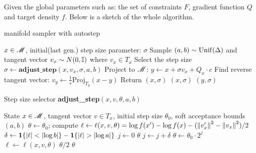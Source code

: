 \documentclass{article}
\begin{document}
Given the global parameters such as: the set of constraints $F$, gradient function $Q$ and target density $f$. Below is a sketch of the whole algorithm.
\begin{algorithm}[H]
\caption{manifold sampler with autostep}
\label{algo:manifold_autostep}
\begin{algorithmic}[1]  
    \Require $x \in \mathscr{M}$, initial(last gen.) step size parameter: $\sigma$
    \State Sample $(a, b) \sim \operatorname{Unif}(\Delta)$ and tangent vector $v_x \sim N(0, \mathbb I)$ where $v_x \in T_x$
    \State Select the step size $\sigma \gets \textbf{adjust\_step}(x, v_x, \sigma, a, b)$ 
    \State Project to $\mathscr{M}$: $y \gets x + \sigma v_x + Q_x\cdot c$ 
    \State Find reverse tangent vector: $v_y \gets \frac{1}{s} \text{Proj}_{T_y}(x-y)$
      
        \State Return $(x, \sigma)$
    \EndIf
     
        \State \Return $(x, \sigma)$
    \EndIf
    \State \Return $(y, \sigma)$
    \end{algorithmic}
\end{algorithm}


\begin{algorithm}[H]
\caption{Step size selector \textbf{adjust\_step}$(x, v, \theta, a, b)$}
\label{algo:stepsize_selector}
\begin{algorithmic}[1]
\Require State $x \in \mathscr{M}$, tangent vector $v \in T_x$, initial step size $\theta_0$, soft acceptance bounds $(a, b)$ 
\State $\theta \gets \theta_0$; compute $\ell \gets \ell(x, v, \theta) = \log f(x') - \log f(x) - (\left\lVert v_x'\right\rVert^2-\left\lVert v_x\right\rVert^2) / 2$
\State $\delta \gets {\mathbf 1}\{\left|\ell\right| < \left|\log b\right|\} - {\mathbf 1}\{\left|\ell\right| > \left|\log a\right|\}$
\State $j \gets 0$
    \State \Return $\theta$
\EndIf
{}
    \State $j \gets j + \delta$
    \State $\theta \gets \theta_0 \cdot 2^j$
    \State $\ell \gets \ell(x, v, \theta)$
        \State \Return $\theta / 2$
        \State \Return $\theta$
    \EndIf
\EndWhile
\end{algorithmic}
\end{algorithm}
\end{document}

